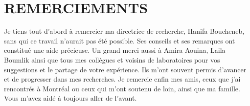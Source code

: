 %
\chapter*{REMERCIEMENTS}\thispagestyle{headings}
%
Je tiens tout d'abord à remercier ma directrice de recherche, Hanifa Boucheneb,
sans qui ce travail n'aurait pas été possible. Ses conseils et ses remarques ont
constitué une aide précieuse. Un grand merci aussi à Amira Aouina, Laila Boumlik
ainsi que tous mes collègues et voisins de laboratoires pour vos suggestions et
le partage de votre expérience. Ils m'ont souvent permis d'avancer et de
progresser dans mes recherches. Je remercie enfin mes amis, ceux que j'ai
rencontrés à Montréal ou ceux qui m'ont soutenu de loin, ainsi que ma famille.
Vous m'avez aidé à toujours aller de l'avant.
